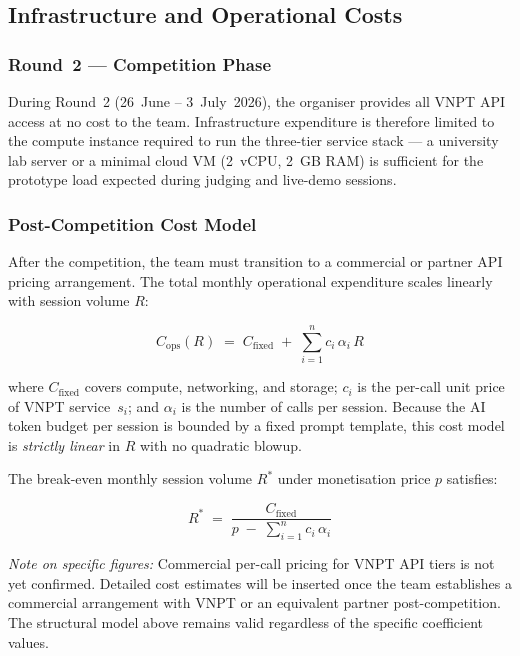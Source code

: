 \subsection{Infrastructure and Operational Costs}
\label{sec:feasibility-costs}

\subsubsection*{Round~2 --- Competition Phase}

During Round~2 (26~June -- 3~July~2026), the organiser provides all VNPT API
access at no cost to the team. Infrastructure expenditure is therefore
limited to the compute instance required to run the three-tier service stack
--- a university lab server or a minimal cloud VM (2~vCPU, 2~GB RAM) is
sufficient for the prototype load expected during judging and live-demo
sessions.

\subsubsection*{Post-Competition Cost Model}

After the competition, the team must transition to a commercial or partner
API pricing arrangement. The total monthly operational expenditure scales
linearly with session volume $R$:

\begin{equation}
  \label{eq:cost-model}
  C_{\mathrm{ops}}(R) \;=\; C_{\mathrm{fixed}} \;+\;
  \sum_{i=1}^{n} c_i\,\alpha_i\,R
\end{equation}

where $C_{\mathrm{fixed}}$ covers compute, networking, and storage;
$c_i$ is the per-call unit price of VNPT service~$s_i$; and $\alpha_i$
is the number of calls per session. Because the AI token budget per session
is bounded by a fixed prompt template, this cost model is
\emph{strictly linear} in $R$ with no quadratic blowup.

The break-even monthly session volume $R^{*}$ under monetisation price $p$
satisfies:

\begin{equation}
  \label{eq:break-even}
  R^{*} \;=\; \frac{C_{\mathrm{fixed}}}
               {p \;-\; \displaystyle\sum_{i=1}^{n} c_i\,\alpha_i}
\end{equation}

\noindent\textit{Note on specific figures:} Commercial per-call pricing
for VNPT API tiers is not yet confirmed. Detailed cost estimates will
be inserted once the team establishes a commercial arrangement with VNPT
or an equivalent partner post-competition. The structural model above
remains valid regardless of the specific coefficient values.

